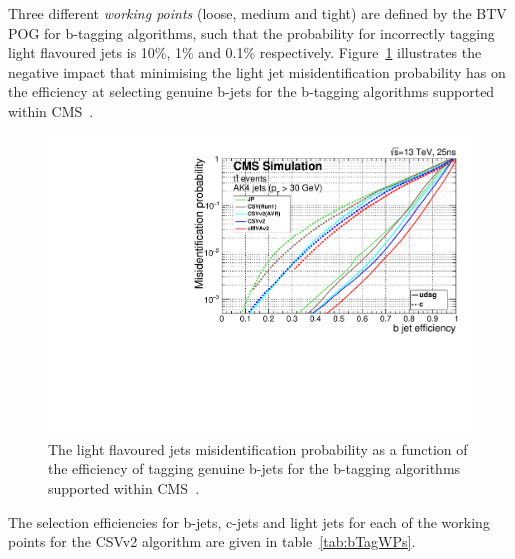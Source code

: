 Three different \emph{working points} (loose, medium and tight) are defined by the BTV POG for b-tagging algorithms, such that the probability for incorrectly tagging light flavoured jets is 10\%, 1\% and 0.1\% respectively.
Figure~\ref{fig:bTagEffVsMisId} illustrates the negative impact that minimising the light jet misidentification probability has on the efficiency at selecting genuine b-jets for the b-tagging algorithms supported within CMS~\cite{Sirunyan:2017ezt}.

\begin{figure}[htbp]
\centering
\includegraphics[width=\textwidth]{figs/data-mc/effVsMisTagcsvV2.pdf}
\caption{The light flavoured jets misidentification probability as a function of the efficiency of tagging genuine b-jets for the b-tagging algorithms supported within CMS~\cite{Sirunyan:2017ezt}.}
\label{fig:bTagEffVsMisId}
\end{figure}

The selection efficiencies for b-jets, c-jets and light jets for each of the working points for the CSVv2 algorithm are given in table~\ref{tab:bTagWPs}.

